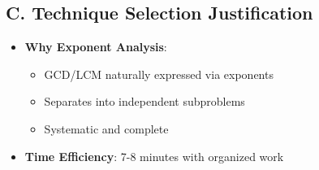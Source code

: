 \documentclass[12pt]{article}
\begin{document}
\begin{techniquesbox}
\subsection*{C. Technique Selection Justification}
\begin{itemize}[leftmargin=*]
    \item \textbf{Why Exponent Analysis}: 
    \begin{itemize}
        \item GCD/LCM naturally expressed via exponents
        \item Separates into independent subproblems
        \item Systematic and complete
    \end{itemize}
    \item \textbf{Time Efficiency}: 7-8 minutes with organized work
\end{itemize}
\end{techniquesbox}
\end{document}
